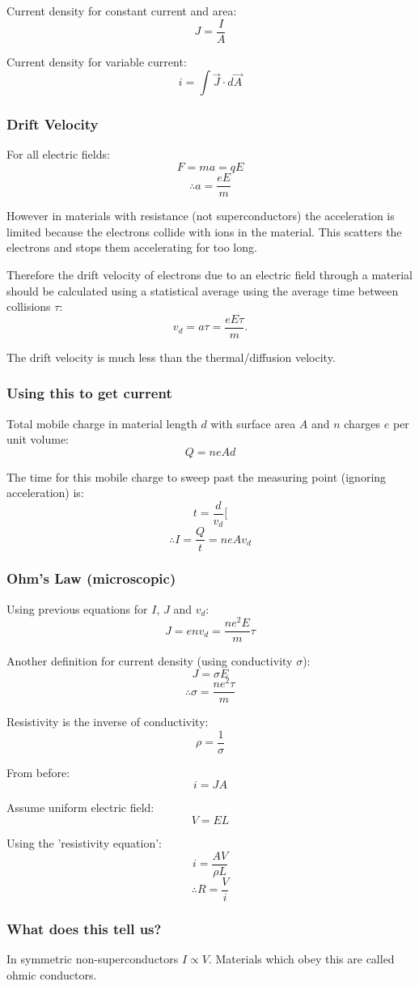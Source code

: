 \documentclass[11pt,a4paper]{report}
\begin{document}
Current density for constant current and area: 
\[J = \frac{I}{A}\]

Current density for variable current: 
\[i = \int \vec{J} \cdot d\vec{A}\] 

\subsubsection{Drift Velocity}
For all electric fields:
\[F = ma = qE\]
\[\therefore a = \frac{eE}{m}\]

However in materials with resistance (not superconductors) the acceleration is limited because the electrons collide with ions in the material. This scatters the electrons and stops them accelerating for too long.

Therefore the drift velocity of electrons due to an electric field through a material should be calculated using a statistical average using the average time between collisions $\tau$:
\[v_d = a\tau = \frac{eE\tau}{m}.\]

The drift velocity is much less than the thermal/diffusion velocity. 

\subsubsection{Using this to get current}
Total mobile charge in material length $d$ with surface area $A$ and $n$ charges $e$ per unit volume:
\[Q=neAd\]

The time for this mobile charge to sweep past the measuring point (ignoring acceleration) is:
\[t=\frac{d}{v_d}[\]
\[\therefore I = \frac{Q}{t} = neAv_d\]

\subsubsection{Ohm's Law (microscopic)}
Using previous equations for $I$, $J$ and $v_d$:
\[J = env_d=\frac{ne^2E}{m}\tau\]

Another definition for current density (using conductivity $\sigma$):
\[J=\sigma E\]
\[\therefore \sigma = \frac{ne^2\tau}{m}\]

Resistivity is the inverse of conductivity:
\[\rho = \frac{1}{\sigma}\]

From before:
\[i=JA\]

Assume uniform electric field:
\[V=EL\]

Using the 'resistivity equation':
\[i=\frac{AV}{\rho L}\]
\[\therefore R=\frac{V}{i}\]

\subsubsection{What does this tell us?}
In symmetric non-superconductors  $I \propto V$. Materials which obey this are called ohmic conductors.
\end{document}
